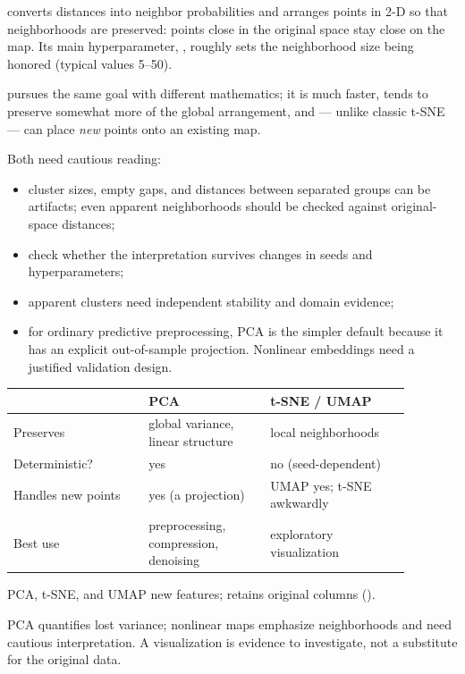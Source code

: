  converts distances into neighbor probabilities and arranges points in 2-D so that neighborhoods are preserved: points close in the original space stay close on the map. Its main hyperparameter, , roughly sets the neighborhood size being honored (typical values 5--50).

 pursues the same goal with different mathematics; it is much faster, tends to preserve somewhat more of the global arrangement, and --- unlike classic t-SNE --- can place \emph{new} points onto an existing map.

Both need cautious reading:

\begin{itemize}
  \item cluster sizes, empty gaps, and distances between separated groups can be artifacts; even apparent neighborhoods should be checked against original-space distances;
  \item check whether the interpretation survives changes in seeds and hyperparameters;
  \item apparent clusters need independent stability and domain evidence;
  \item for ordinary predictive preprocessing, PCA is the simpler default because it has an explicit out-of-sample projection. Nonlinear embeddings need a justified validation design.
\end{itemize}

\begin{mltable}
\begin{tabular}{@{}p{0.3\linewidth}p{0.27\linewidth}p{0.31\linewidth}@{}}
\toprule
\rowcolor{MLPaleBlue!92}
 & PCA & t-SNE / UMAP \\
\midrule
Preserves & global variance, linear structure & local neighborhoods \\
Deterministic? & yes & no (seed-dependent) \\
Handles new points & yes (a projection) & UMAP yes; t-SNE awkwardly \\
Best use & preprocessing, compression, denoising & exploratory visualization \\
\bottomrule
\end{tabular}
\end{mltable}

PCA, t-SNE, and UMAP  new features;  retains original columns ().

\begin{keyidea}
PCA quantifies lost variance; nonlinear maps emphasize neighborhoods and need cautious interpretation. A visualization is evidence to investigate, not a substitute for the original data.
\end{keyidea}

